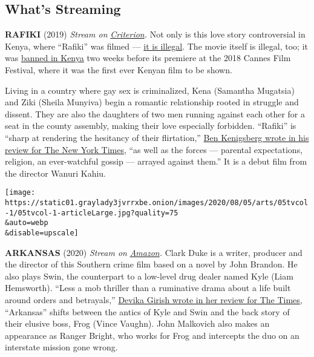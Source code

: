 \hypertarget{whats-streaming}{%
\subsection{What's Streaming}\label{whats-streaming}}

\textbf{RAFIKI} (2019) \emph{Stream on}
\href{https://www.criterionchannel.com/rafiki}{\emph{Criterion}}\emph{.}
Not only is this love story controversial in Kenya, where ``Rafiki'' was
filmed ---
\href{https://www.npr.org/2019/05/24/726541735/kenyas-judges-uphold-laws-that-criminalize-gay-sex}{it
is illegal}. The movie itself is illegal, too; it was
\href{https://www.nytimes3xbfgragh.onion/2018/04/27/world/africa/kenya-cannes-film-lesbians-banned.html}{banned
in Kenya} two weeks before its premiere at the 2018 Cannes Film
Festival, where it was the first ever Kenyan film to be shown.

Living in a country where gay sex is criminalized, Kena (Samantha
Mugatsia) and Ziki (Sheila Munyiva) begin a romantic relationship rooted
in struggle and dissent. They are also the daughters of two men running
against each other for a seat in the county assembly, making their love
especially forbidden. ``Rafiki'' is ``sharp at rendering the hesitancy
of their flirtation,''
\href{https://www.nytimes3xbfgragh.onion/2019/04/18/movies/rafiki-review.html}{Ben
Kenigsberg wrote in his review for The New York Times}, ``as well as the
forces --- parental expectations, religion, an ever-watchful gossip ---
arrayed against them.'' It is a debut film from the director Wanuri
Kahiu.

\texttt{[image: https://static01.graylady3jvrrxbe.onion/images/2020/08/05/arts/05tvcol-1/05tvcol-1-articleLarge.jpg?quality=75\\\&auto=webp\\\&disable=upscale]}

\textbf{ARKANSAS} (2020) \emph{Stream on}
\href{https://www.amazon.com/Arkansas-Liam-Hemsworth/dp/B085NNRX6J}{\emph{Amazon}}\emph{.}
Clark Duke is a writer, producer and the director of this Southern crime
film based on a novel by John Brandon. He also plays Swin, the
counterpart to a low-level drug dealer named Kyle (Liam Hemsworth).
``Less a mob thriller than a ruminative drama about a life built around
orders and betrayals,''
\href{https://www.nytimes3xbfgragh.onion/2020/05/07/movies/arkansas-review.html}{Devika
Girish wrote in her review for The Times}, ``Arkansas'' shifts between
the antics of Kyle and Swin and the back story of their elusive boss,
Frog (Vince Vaughn). John Malkovich also makes an appearance as Ranger
Bright, who works for Frog and intercepts the duo on an interstate
mission gone wrong.

